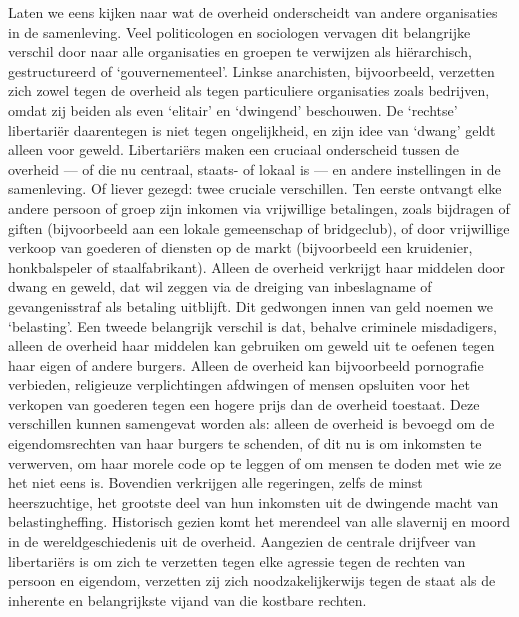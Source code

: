 \documentclass[
  a5paper,
  smalldemyvopaper,10pt,twoside,onecolumn,openright,extrafontsizes,hidelinks]{memoir}
\begin{document}
Laten we eens kijken naar wat de overheid onderscheidt van andere
organisaties in de samenleving. Veel politicologen en sociologen
vervagen dit belangrijke verschil door naar alle organisaties en groepen
te verwijzen als hiërarchisch, gestructureerd of `gouvernementeel'.
Linkse anarchisten, bijvoorbeeld, verzetten zich zowel tegen de overheid
als tegen particuliere organisaties zoals bedrijven, omdat zij beiden
als even `elitair' en `dwingend' beschouwen. De `rechtse' libertariër
daarentegen is niet tegen ongelijkheid, en zijn idee van `dwang' geldt
alleen voor geweld. Libertariërs maken een cruciaal onderscheid tussen
de overheid --- of die nu centraal, staats- of lokaal is --- en andere
instellingen in de samenleving. Of liever gezegd: twee cruciale
verschillen. Ten eerste ontvangt elke andere persoon of groep zijn
inkomen via vrijwillige betalingen, zoals bijdragen of giften
(bijvoorbeeld aan een lokale gemeenschap of bridgeclub), of door
vrijwillige verkoop van goederen of diensten op de markt (bijvoorbeeld
een kruidenier, honkbalspeler of staalfabrikant). Alleen de overheid
verkrijgt haar middelen door dwang en geweld, dat wil zeggen via de
dreiging van inbeslagname of gevangenisstraf als betaling uitblijft. Dit
gedwongen innen van geld noemen we `belasting'. Een tweede belangrijk
verschil is dat, behalve criminele misdadigers, alleen de overheid haar
middelen kan gebruiken om geweld uit te oefenen tegen haar eigen of
andere burgers. Alleen de overheid kan bijvoorbeeld pornografie
verbieden, religieuze verplichtingen afdwingen of mensen opsluiten voor
het verkopen van goederen tegen een hogere prijs dan de overheid
toestaat. Deze verschillen kunnen samengevat worden als: alleen de
overheid is bevoegd om de eigendomsrechten van haar burgers te schenden,
of dit nu is om inkomsten te verwerven, om haar morele code op te leggen
of om mensen te doden met wie ze het niet eens is. Bovendien verkrijgen
alle regeringen, zelfs de minst heerszuchtige, het grootste deel van hun
inkomsten uit de dwingende macht van belastingheffing. Historisch gezien
komt het merendeel van alle slavernij en moord in de wereldgeschiedenis
uit de overheid. Aangezien de centrale drijfveer van libertariërs is om
zich te verzetten tegen elke agressie tegen de rechten van persoon en
eigendom, verzetten zij zich noodzakelijkerwijs tegen de staat als de
inherente en belangrijkste vijand van die kostbare rechten.
\end{document}

